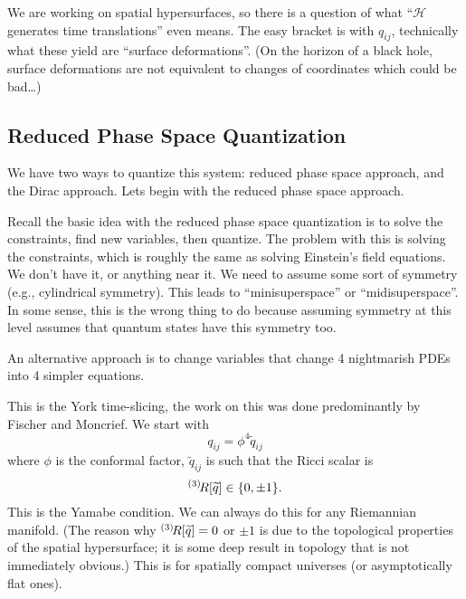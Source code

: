 We are working on spatial hypersurfaces, so there is a question of
what ``$\mathcal{H}$ generates time translations'' even means. The easy
bracket is with $q_{ij}$, technically what these yield are ``surface
deformations''.
(On the horizon of a black hole, surface deformations are not equivalent
to changes of coordinates which could be bad\dots)

\subsection{Reduced Phase Space Quantization}

We have two ways to quantize this system: reduced phase space approach,
and the Dirac approach. Lets begin with the reduced phase space
approach.

Recall the basic idea with the reduced phase space quantization is to
solve the constraints, find new variables, then quantize. The problem
with this is solving the constraints, which is roughly the same as
solving Einstein's field equations. We don't have it, or anything near
it. We need to assume some sort of symmetry (e.g., cylindrical
symmetry). This leads to ``minisuperspace'' or ``midisuperspace''.
In some sense, this is the wrong thing to do because assuming symmetry
at this level assumes that quantum states have this symmetry too.

An alternative approach is to change variables that change 4 nightmarish
PDEs into 4 simpler equations.

This is the York time-slicing,
the work on this was done predominantly by Fischer and Moncrief.
We start with
\begin{equation}
q_{ij} = \phi^{4}\widetilde{q}_{ij}
\end{equation}
where $\phi$ is the conformal factor, $\widetilde{q}_{ij}$ is such that
the Ricci scalar is
\begin{equation}
{{}^{(3)}\!R}[\widetilde{q}]\in\{0,\pm1\}.
\end{equation}
This is the Yamabe condition. We can always do this for any Riemannian
manifold.
(The reason why ${{}^{(3)}\!R}[\widetilde{q}]=0$ or $\pm1$ is due to the
topological properties of the spatial hypersurface; it is some deep
result in topology that is not immediately obvious.) This is for
spatially compact universes (or asymptotically flat ones).


